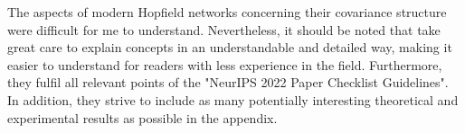\documentclass{scrarticle}
\begin{document}
The aspects of modern Hopfield networks concerning their covariance structure were difficult for me to understand. Nevertheless, it should be noted that \citet{cloob} take great care to explain concepts in an understandable and detailed way, making it easier to understand for readers with less experience in the field. Furthermore, they fulfil all relevant points of the "NeurIPS 2022 Paper Checklist Guidelines". In addition, they strive to include as many potentially interesting theoretical and experimental results as possible in the appendix.

\clearpage
\printbibliography
\end{document}
